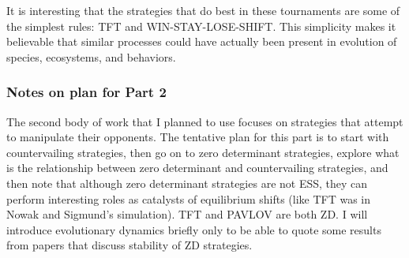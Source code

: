 It is interesting that the strategies that do best in these tournaments are some of the simplest rules: TFT and WIN-STAY-LOSE-SHIFT. This simplicity makes it believable that similar processes could have actually been present in evolution of species, ecosystems, and behaviors.

\subsubsection{Notes on plan for Part 2}
The second body of work that I planned to use focuses on strategies that attempt to manipulate their opponents. The tentative plan for this part is to start with countervailing strategies, then go on to zero determinant strategies, explore what is the relationship between zero determinant and countervailing strategies, and then note that although zero determinant strategies are not ESS, they can perform interesting roles as catalysts of equilibrium shifts (like TFT was in Nowak and Sigmund's simulation). TFT and PAVLOV are both ZD. I will introduce evolutionary dynamics briefly only to be able to quote some results from papers that discuss stability of ZD strategies.







